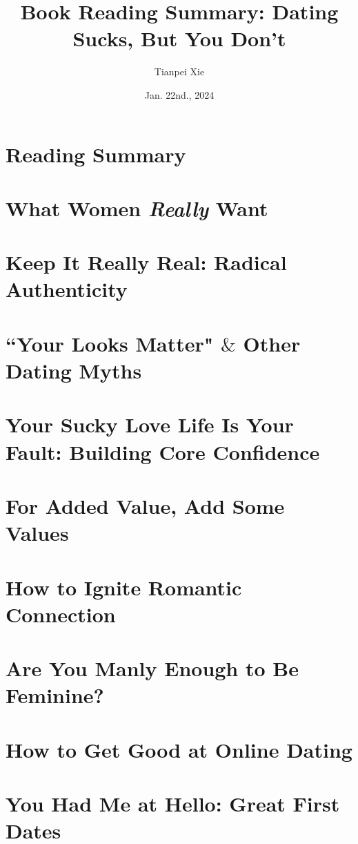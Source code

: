 \documentclass[11pt]{article}
\begin{document}
\title{Book Reading Summary: Dating Sucks, But You Don't}
\author{ Tianpei Xie}
\date{Jan. 22nd., 2024}
\maketitle
\tableofcontents
\newpage
\section{Reading Summary}

\newpage
\section{What Women \emph{Really} Want}

\section{Keep It Really Real: Radical Authenticity}

\section{``Your Looks Matter" $\&$ Other Dating Myths}

\section{Your Sucky Love Life Is Your Fault: Building Core Confidence}


\section{For Added Value, Add Some Values}

\section{How to Ignite Romantic Connection}

\section{Are You Manly Enough to Be Feminine?}

\section{How to Get Good at Online Dating}

\section{You Had Me at Hello: Great First Dates}
\end{document}
